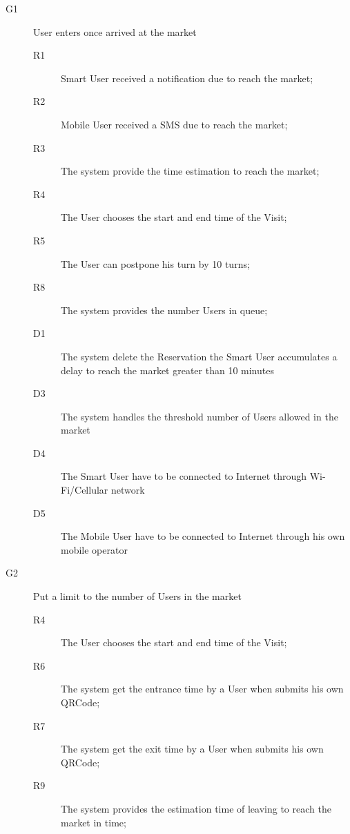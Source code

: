  


\begin{description}
    \item[G1]User enters once arrived at the market
    
    \begin{description}
    \item[R1] Smart User received a notification due to reach the market;
    \item[R2] Mobile User received a SMS due to reach the market;  %
    \item[R3] The system provide the time estimation to reach the market;
    \item[R4] The User chooses the start and end time of the Visit;
    \item[R5] The User can postpone his turn by 10 turns;
    \item[R8] The system provides the number Users in queue; %
    \item[D1] The system delete the Reservation the Smart User accumulates a delay to reach the market greater than 10 minutes
    \item[D3] The system handles the threshold number of Users allowed in the market
    \item[D4] The Smart User have to be connected to Internet through Wi-Fi/Cellular network
    \item[D5] The Mobile User have to be connected to Internet through his own mobile operator
    \end{description}
    
    \item[G2]Put a limit to the number of Users in the market
    
    \begin{description}
    \item[R4] The User chooses the start and end time of the Visit;
    \item[R6] The system get the entrance time by a User when submits his own QRCode;
    \item[R7] The system get the exit time by a User when submits his own QRCode;
    \item[R9] The system provides the estimation time of leaving to reach the market in time;
    \end{description}
    

\end{description}
